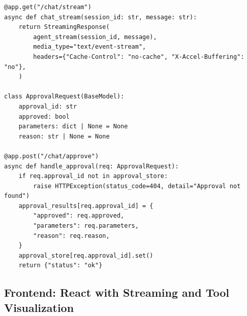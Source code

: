 \begin{lstlisting}[style=pythonstyle, caption={FastAPI backend with streaming and approval gates}]
@app.get("/chat/stream")
async def chat_stream(session_id: str, message: str):
    return StreamingResponse(
        agent_stream(session_id, message),
        media_type="text/event-stream",
        headers={"Cache-Control": "no-cache", "X-Accel-Buffering": "no"},
    )

class ApprovalRequest(BaseModel):
    approval_id: str
    approved: bool
    parameters: dict | None = None
    reason: str | None = None

@app.post("/chat/approve")
async def handle_approval(req: ApprovalRequest):
    if req.approval_id not in approval_store:
        raise HTTPException(status_code=404, detail="Approval not found")
    approval_results[req.approval_id] = {
        "approved": req.approved,
        "parameters": req.parameters,
        "reason": req.reason,
    }
    approval_store[req.approval_id].set()
    return {"status": "ok"}
\end{lstlisting}

\subsection{Frontend: React with Streaming and Tool Visualization}
\label{frontend-react-with-streaming-and-tool-visualization}

